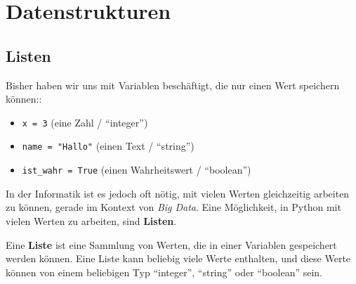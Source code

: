\chapter{Datenstrukturen}
\section{Listen}
Bisher haben wir uns mit Variablen beschäftigt, die nur einen Wert speichern können::
\begin{itemize}
    \item \lstinline|x = 3| (eine Zahl / \enquote{integer})
    \item \lstinline|name = "Hallo"| (einen Text /  \enquote{string})
    \item \lstinline|ist_wahr = True| (einen Wahrheitswert / \enquote{boolean})
\end{itemize}

In der Informatik ist es jedoch oft nötig, mit vielen Werten gleichzeitig arbeiten zu können, gerade im Kontext von \textit{Big Data}. Eine Möglichkeit, in Python mit vielen Werten zu arbeiten, sind \textbf{Listen}.

\begin{mydefinition}
Eine \textbf{Liste} ist eine Sammlung von Werten, die in einer Variablen gespeichert werden können. Eine Liste kann beliebig viele Werte enthalten, und diese Werte können von einem beliebigen Typ \enquote{integer}, \enquote{string} oder \enquote{boolean} sein.
\end{mydefinition}

